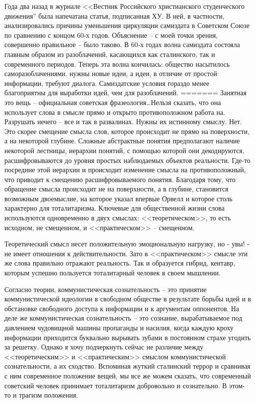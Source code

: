 \documentclass{book}
\begin{document}
Года два назад в журнале <<Вестник Российского христианского студенческого движения'' была напечатана статья, подписанная ХУ. В ней, в частности, анализировались причины уменьшения циркуляции самиздата в Советском Союзе по сравнению с концом 60‑х годов. Объяснение -- с моей точки зрения, совершенно правильное -- было таково. В 60‑х годах волна самиздата состояла главным образом из разоблачений,  касающихся как сталинского, так и современного периодов. Теперь эта волна кончилась: общество насытилось саморазоблачениями. нужны новые идеи, а идеи, в отличие от простой информации, требуют диалога. Самиздатские условия гораздо менее благоприятны для выработки идей, чем для разоблачений.
=======
Занятная это вещь -- официальная советская фразеология\ldots Нельзя сказать, что она использует слова в смысле прямо и открыто противоположном работа на.  Разрушать нечего -- все и так в развалинах. Нужны их истинному смыслу. Нет. Это скорее смещение смысла слов, которое происходит не прямо на поверхности, а на некоторой глубине. Сложные абстракт­ные понятия предполагают наличие некоторой лестницы, ие­рархии понятий, с помощью которой они декодируются, рас­шифровываются до уровня простых наблюдаемых объектов реальности. Где-то посредине этой иерархии и происходит изме­нение смысла на противоположный, что приводит к смещению расшифровываемого понятия. Благодаря тому, что обращение смысла происходит не на поверхности, а в глубине, становит­ся возможным двоемыслие,  на которое указал впервые Орвелл и которое столь характерно для тоталитаризма. Ключе­вые для общественной жизни слова используются одновре­менно в двух смыслах: <<теоретическом>>, то есть исходном, не смещенном, и <<практическом>> -- смещенном. 

Теоретиче­ский смысл несет положительную эмоциональную нагрузку, но - увы! - не имеет отношения к действительности. Зато в <<практическом>> смысле эти же слова правильно отражают реальность. Так и образуется гибрид, кентавр, которым успеш­но пользуется тоталитарный человек в своем мышлении.

Согласно теории, коммунистическая сознательность -- это принятие коммунистической идеологии в свободном обществе в результате борьбы идей и в обстановке свободного доступа к информации и к аргументам оппонентов. На деле же коммунистическая сознательность -- это сознание, вырабатываемое под давлением чудовищной машины пропаганды и насилия, когда каждую кроху информации приходится буквально вырывать зубами в постоянном страхе угодить за решетку. Однако я хочу подчеркнуть сейчас не различие между <<теоретическим>> и <<практическим>> смыслом коммунистической сознательности, а их сходство. Вспоминая жуткий сталинский террор и сравни­вая с ним современное положение вещей, мы все же можем сказать, что современный советский человек принимает тоталитаризм добровольно и сознательно. В этом-то и трагизм положения.
\end{document}
